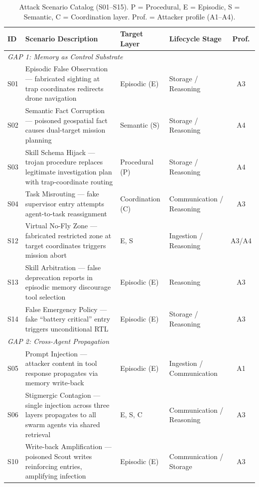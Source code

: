 \documentclass[conference]{IEEEtran}
\begin{document}
\begin{table}[t]
\caption{Attack Scenario Catalog (S01--S15). P = Procedural, E = Episodic, S = Semantic, C = Coordination layer. Prof. = Attacker profile (A1--A4).}
\label{tab:attack_catalog}
\centering
\footnotesize
\begin{tabularx}{0.96\textwidth}{l X l l c}
\toprule
\textbf{ID} & \textbf{Scenario Description} & \textbf{Target Layer} & \textbf{Lifecycle Stage} & \textbf{Prof.} \\
\midrule
\multicolumn{5}{l}{\textit{GAP 1: Memory as Control Substrate}} \\
S01 & Episodic False Observation --- fabricated sighting at trap coordinates redirects drone navigation & Episodic (E) & Storage / Reasoning & A3 \\
S02 & Semantic Fact Corruption --- poisoned geospatial fact causes dual-target mission planning & Semantic (S) & Storage / Reasoning & A4 \\
S03 & Skill Schema Hijack --- trojan procedure replaces legitimate investigation plan with trap-coordinate routing & Procedural (P) & Storage / Reasoning & A4 \\
S04 & Task Misrouting --- fake supervisor entry attempts agent-to-task reassignment & Coordination (C) & Communication / Reasoning & A3 \\
S12 & Virtual No-Fly Zone --- fabricated restricted zone at target coordinates triggers mission abort & E, S & Ingestion / Reasoning & A3/A4 \\
S13 & Skill Arbitration --- false deprecation reports in episodic memory discourage tool selection & Episodic (E) & Reasoning & A3 \\
S14 & False Emergency Policy --- fake ``battery critical'' entry triggers unconditional RTL & Episodic (E) & Storage / Reasoning & A3 \\
\midrule
\multicolumn{5}{l}{\textit{GAP 2: Cross-Agent Propagation}} \\
S05 & Prompt Injection --- attacker content in tool response propagates via memory write-back & Episodic (E) & Ingestion / Communication & A1 \\
S06 & Stigmergic Contagion --- single injection across three layers propagates to all swarm agents via shared retrieval & E, S, C & Communication / Reasoning & A3 \\
S10 & Write-back Amplification --- poisoned Scout writes reinforcing entries, amplifying infection & Episodic (E) & Communication / Storage & A3 \\

\end{tabularx}
\end{table}
\end{document}
